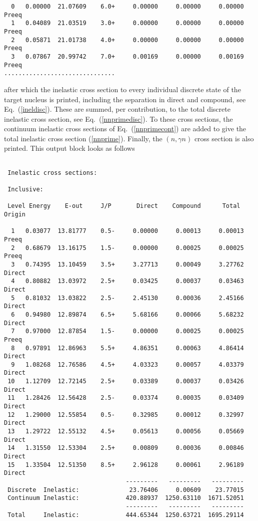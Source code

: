 \begin{samplecase}
{\begin{verbatim}
  0   0.00000  21.07609    6.0+     0.00000     0.00000     0.00000    Preeq
  1   0.04089  21.03519    3.0+     0.00000     0.00000     0.00000    Preeq
  2   0.05871  21.01738    4.0+     0.00000     0.00000     0.00000    Preeq
  3   0.07867  20.99742    7.0+     0.00169     0.00000     0.00169    Preeq
...............................
\end{verbatim} } \renewcommand{\baselinestretch}{1.07}\small\normalsize
\noindent
after which the inelastic cross section to every individual discrete state of 
the target nucleus is printed, including the separation in direct and compound, 
see Eq.~(\ref{ineldisc}). These are summed, per contribution, to the total 
discrete inelastic cross section, see Eq.~(\ref{nnprimedisc}). To these cross 
sections, the continuum inelastic cross sections of Eq.~(\ref{nnprimecont}) are 
added to give the total inelastic cross section (\ref{nnprime}). Finally, the
$(n,\gamma n)$ cross section is also printed. This output block looks as follows

{\small \begin{verbatim}

 Inelastic cross sections:

 Inclusive:

 Level Energy    E-out     J/P       Direct    Compound      Total     Origin

  1   0.03077  13.81777    0.5-     0.00000     0.00013     0.00013    Preeq
  2   0.68679  13.16175    1.5-     0.00000     0.00025     0.00025    Preeq
  3   0.74395  13.10459    3.5+     3.27713     0.00049     3.27762    Direct
  4   0.80882  13.03972    2.5+     0.03425     0.00037     0.03463    Direct
  5   0.81032  13.03822    2.5-     2.45130     0.00036     2.45166    Direct
  6   0.94980  12.89874    6.5+     5.68166     0.00066     5.68232    Direct
  7   0.97000  12.87854    1.5-     0.00000     0.00025     0.00025    Preeq
  8   0.97891  12.86963    5.5+     4.86351     0.00063     4.86414    Direct
  9   1.08268  12.76586    4.5+     4.03323     0.00057     4.03379    Direct
 10   1.12709  12.72145    2.5+     0.03389     0.00037     0.03426    Direct
 11   1.28426  12.56428    2.5-     0.03374     0.00035     0.03409    Direct
 12   1.29000  12.55854    0.5-     0.32985     0.00012     0.32997    Direct
 13   1.29722  12.55132    4.5+     0.05613     0.00056     0.05669    Direct
 14   1.31550  12.53304    2.5+     0.00809     0.00036     0.00846    Direct
 15   1.33504  12.51350    8.5+     2.96128     0.00061     2.96189    Direct
                                  ---------   ---------   ---------
 Discrete  Inelastic:              23.76406     0.00609    23.77015
 Continuum Inelastic:             420.88937  1250.63110  1671.52051
                                  ---------   ---------   ---------
 Total     Inelastic:             444.65344  1250.63721  1695.29114


\end{verbatim}}
\end{samplecase}
